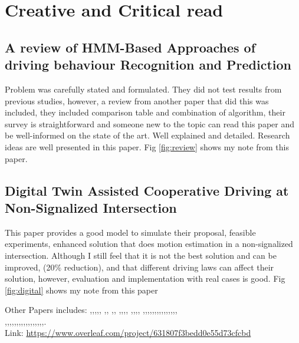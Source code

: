 \documentclass{article}
\begin{document}
\section{Creative and Critical read}
\subsection{A review of HMM-Based Approaches of driving behaviour Recognition and Prediction} 
Problem was carefully stated and formulated. They did not test results from previous studies, however, a review from another paper that did this was included, they included comparison table and combination of algorithm, their survey is straightforward and someone new to the topic can read this paper and be well-informed on the state of the art. Well explained and detailed. Research ideas are well presented in this paper. Fig \ref{fig:review} shows my note from this paper.
\subsection{Digital Twin Assisted Cooperative Driving at Non-Signalized Intersection} This paper provides a good model to simulate their proposal, feasible experiments, enhanced solution that does motion estimation in a non-signalized intersection. Although I still feel that it is not the best solution and can be improved, (20$\%$ reduction), and that different driving laws can affect their solution, however, evaluation and implementation with real cases is good. Fig \ref{fig:digital} shows my note from this paper

Other Papers includes:
\cite{9068410},\cite{9277572},\cite{9291414},\cite{9291433},\cite{9305274}, \cite{9310276},\cite{9314262}, \cite{9319548},\cite{9351650}, \cite{9359494},\cite{9362281},\cite{9366366},\cite{9368510}, \cite{9372802},\cite{9372805},\cite{9380511},\cite{9380554}, \cite{9380699},\cite{9381686},\cite{9384276},\cite{9384316},\cite{9409672},\cite{9427213},\cite{9437967},\cite{9445043},\cite{9478305},\cite{9484798},\cite{9497693},\cite{9511277},\cite{9536371},\cite{9560150},\cite{9580729},\\\cite{9591277},\cite{9591322},\cite{9625720},\cite{9670638},\cite{9678034},\cite{9684928},\cite{9689059},\cite{9693162},\cite{9693282},\cite{9696256},\cite{9712376},\cite{9743954},\cite{9761398},\cite{9761719},\cite{9809823},\cite{9815528},\cite{9826530},\cite{9826532}.\\
Link: \url{https://www.overleaf.com/project/631807f3bedd0e55d73cfcbd}


\end{document}
